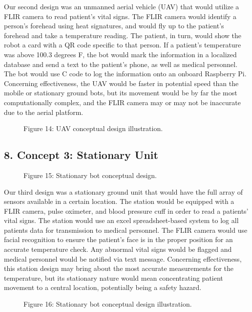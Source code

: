 ﻿\documentclass[10pt]{article}
\begin{document}
Our second design was an unmanned aerial vehicle (UAV) that would utilize a FLIR camera to read patient’s vital signs. The FLIR camera would identify a person’s forehead using heat signatures, and would fly up to the patient’s forehead and take a temperature reading. The patient, in turn, would show the robot a card with a QR code specific to that person. If a patient’s temperature was above 100.3 degrees F, the bot would mark the information in a localized database and send a text to the patient’s phone, as well as medical personnel. The bot would use C code to log the information onto an onboard Raspberry Pi. Concerning effectiveness, the UAV would be faster in potential speed than the mobile or stationary ground bots, but its movement would be by far the most computationally complex, and the FLIR camera may or may not be inaccurate due to the aerial platform.
\begin{figure}
\caption{Figure 14: UAV conceptual design illustration.}
\label{fig:14}
\end{figure}

\subsection{8. Concept 3:  Stationary Unit}
%	
%
%	
%
\begin{figure}
\caption{Figure 15: Stationary bot conceptual design.}
\label{fig:15}
\end{figure}

        Our third design was a stationary ground unit that would have the full array of sensors available in a certain location. The station would be equipped with a FLIR camera, pulse oximeter, and blood pressure cuff in order to read a patients’ vital signs. The station would use an excel spreadsheet-based system to log all patients data for transmission to medical personnel. The FLIR camera would use facial recognition to ensure the patient’s face is in the proper position for an accurate temperature check. Any abnormal vital signs would be flagged and medical personnel would be notified via text message. Concerning effectiveness, this station design may bring about the most accurate measurements for the temperature, but its stationary nature would mean concentrating patient movement to a central location, potentially being a safety hazard. 
\begin{figure}
\caption{Figure 16: Stationary bot conceptual design illustration.}
\label{fig:16}
\end{figure}
\end{document}
